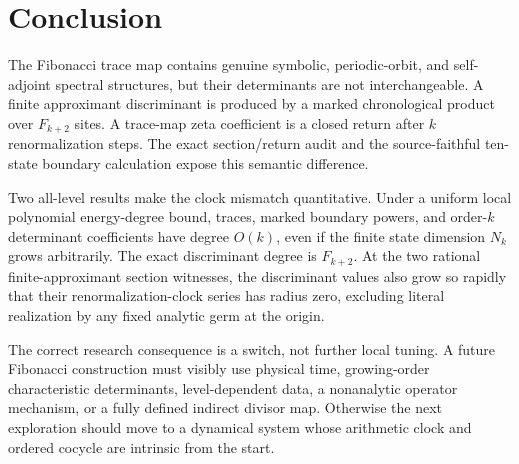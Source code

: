\section{Conclusion}

The Fibonacci trace map contains genuine symbolic, periodic-orbit, and
self-adjoint spectral structures, but their determinants are not
interchangeable.  A finite approximant discriminant is produced by a marked
chronological product over \(F_{k+2}\) sites.  A trace-map zeta coefficient is
a closed return after \(k\) renormalization steps.  The exact section/return
audit and the source-faithful ten-state boundary calculation expose this
semantic difference.

Two all-level results make the clock mismatch quantitative.  Under a uniform
local polynomial energy-degree bound, traces, marked boundary powers, and
order-\(k\) determinant coefficients have degree \(O(k)\), even if the finite
state dimension \(N_k\) grows arbitrarily.  The exact discriminant degree is
\(F_{k+2}\).  At the two rational finite-approximant section witnesses, the
discriminant values also grow so rapidly that their renormalization-clock
series has radius zero,
excluding literal realization by any fixed analytic germ at the origin.

The correct research consequence is a switch, not further local tuning.  A
future Fibonacci construction must visibly use physical time, growing-order
characteristic determinants, level-dependent data, a nonanalytic operator
mechanism, or a fully defined indirect divisor map.  Otherwise the next
exploration should move to a dynamical system whose arithmetic clock and
ordered cocycle are intrinsic from the start.

